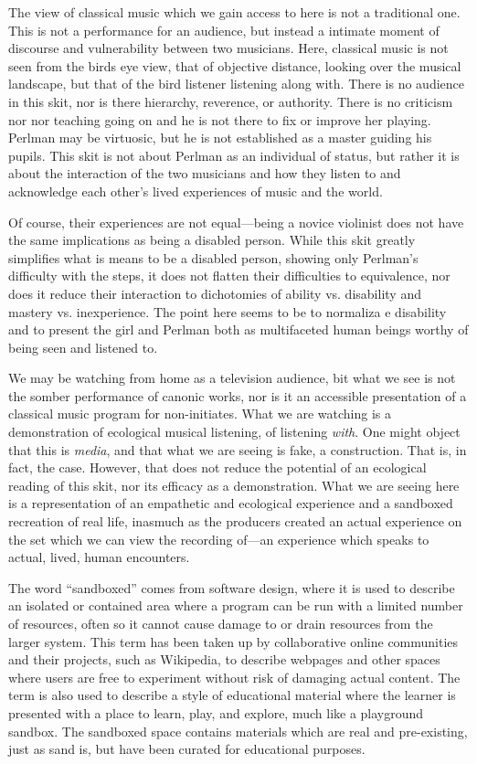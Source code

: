 \documentclass[12pt,letterpaper]{article}
\begin{document}
	The view of classical music which we gain access to here is not a
	traditional one. This is not a performance for an audience, but instead
	a intimate moment of discourse and vulnerability between two 
	musicians. Here, classical music is not seen from the birds eye view,
	that of 
	objective distance, looking over the musical landscape, but that of the 
	bird listener listening along with. There is no audience in this skit, 
	nor is there hierarchy, reverence, or authority. There is no criticism
	nor nor teaching going on and he is not there to fix or improve her
	playing. Perlman may be
	virtuosic, but he is not established as a master guiding his pupils.
	This skit is not about Perlman as an individual of status, but rather
	it is about the interaction of the two musicians and how they listen to 
	and acknowledge each other's lived experiences of music and the world. 

	Of course, their experiences are not equal---being a novice violinist does
	not have the same implications as being a disabled person. While this
	skit greatly simplifies what is means to be a disabled person, showing 
	only Perlman's difficulty with the steps, it does not flatten their 
	difficulties to equivalence, nor does
	it reduce their interaction to dichotomies of ability vs. disability 
	and mastery vs. inexperience. The point here seems to be to normaliza
	e disability and to present the girl and Perlman both as multifaceted
	 human beings worthy of being seen and listened to. 
	
	We may be watching from home as a television audience, bit what we see
	is not the somber performance of canonic works, nor is it an accessible
	presentation of a classical music program for non-initiates. What we 
	are watching is a demonstration of ecological musical listening, of 
	listening \textit{with}. One might object that this is \textit{media}, 
	and that what we are
	seeing is fake, a construction. That is, in fact, the case. However, 
	that does not reduce the potential of an ecological reading of this 
	skit, nor its efficacy as a demonstration. What we are seeing here is a 
	representation of an empathetic and ecological experience and a 
	sandboxed recreation of real life, inasmuch as the producers created an
	actual experience on the set which we can view the recording of---an 
	experience which speaks to actual, lived, human encounters. 

	The word ``sandboxed'' comes from software design, where it is used
	to describe an isolated or contained area where a program can be run 
	with a limited number of resources, often so it cannot cause damage to
	or drain resources from the larger system. This term has been taken up
	by collaborative online communities and their projects, such as 
	Wikipedia, to describe webpages and other spaces where users are free 
	to experiment without risk of damaging actual 
	content.\autocite{Wiktionary} The term is also used
	to describe a style of educational material where the learner is
	presented with a place to learn, play, and explore, much like a
	playground sandbox. The sandboxed space contains materials which are
	real and pre-existing, just as sand is, but have been curated for 
	educational purposes.
	
\end{document}
